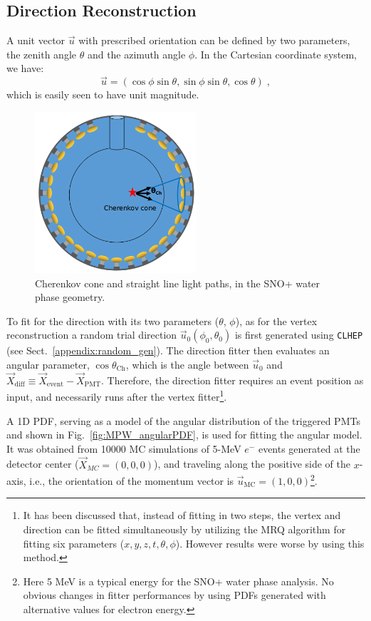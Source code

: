 \subsection{Direction Reconstruction}\label{sect:waterDirection}

A unit vector $\vec{u}$ with prescribed orientation can be defined by two parameters, the zenith angle $\theta$ and the azimuth angle $\phi$. In the Cartesian coordinate system, we have: 
\begin{equation}
\vec{u}=(\cos\phi\sin\theta,\sin\phi\sin\theta,\cos\theta) \;, 
\end{equation}
which is easily seen to have unit magnitude.

\begin{figure}[htbp]
	\centering
	\includegraphics[width=6cm]{mpwDiagram2.png}
	\caption[Cherenkov cone and straight line light paths (SNO+ water phase).]{Cherenkov cone and straight line light paths, in the SNO+ water phase geometry.}
	\label{mpwdiagram_direction}
\end{figure}
To fit for the direction with its two parameters ($\theta$, $\phi$), as for the vertex reconstruction a random trial direction $\vec{u}_0(\phi_0,\theta_0)$ is first generated using \texttt{CLHEP} (see Sect.~\ref{appendix:random_gen}). The direction fitter then evaluates an angular parameter, $\cos\theta_{\mathrm{Ch}}$, which is the angle between $\vec{u}_{0}$ and $\vec{X}_{\mathrm{diff}}\equiv \vec{X}_{\mathrm{event}}-\vec{X}_{\mathrm{PMT}}$. Therefore, the direction fitter requires an event position as input, and necessarily runs after the vertex fitter\footnote{It has been discussed that, instead of fitting in two steps, the vertex and direction can be fitted simultaneously by utilizing the MRQ algorithm for fitting six parameters ($x,y,z,t,\theta,\phi$). However results were worse by using this method.}.

A 1D PDF, serving as a model of the angular distribution of the triggered PMTs and shown in Fig.~\ref{fig:MPW_angularPDF}, is used for fitting the angular model. It was obtained from 10000 MC simulations of 5-MeV $e^-$ events generated at the detector center ($\vec{X}_{MC}=(0,0,0)$), and traveling along the positive side of the $x$-axis, i.e., the orientation of the momentum vector is $\vec{u}_{\mathrm{MC}}=(1,0,0)$\footnote{Here 5 MeV is a typical energy for the SNO+ water phase analysis. No obvious changes in fitter performances by using PDFs generated with alternative values for electron energy.}.

